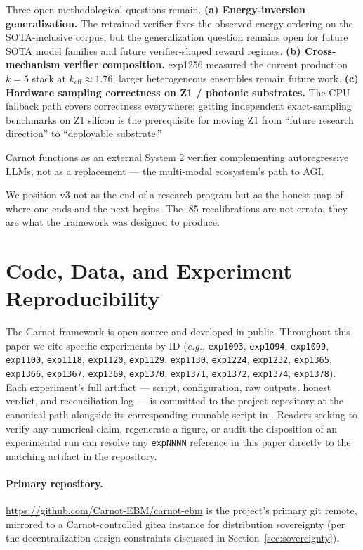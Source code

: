\documentclass[10pt]{article}
\begin{document}
Three open methodological questions remain. \textbf{(a)
Energy-inversion generalization.} The retrained verifier fixes the
observed energy ordering on the SOTA-inclusive corpus, but the
generalization question remains open for future SOTA model families
and future verifier-shaped reward regimes. \textbf{(b) Cross-mechanism
verifier composition.} exp1256 measured the current production
$k=5$ stack at $k_{\text{eff}} \approx 1.76$; larger heterogeneous
ensembles remain future work. \textbf{(c) Hardware sampling correctness on Z1 / photonic
substrates.} The CPU fallback path covers correctness everywhere;
getting independent exact-sampling benchmarks on Z1 silicon is the
prerequisite for moving Z1 from ``future research direction'' to
``deployable substrate.''

Carnot functions as an external System 2 verifier complementing
autoregressive LLMs, not as a replacement --- the multi-modal
ecosystem's path to AGI.

We position v3 not as the end of a research program but as the
honest map of where one ends and the next begins. The .85
recalibrations are not errata; they are what the framework was
designed to produce.

\section*{Code, Data, and Experiment Reproducibility}
\label{sec:availability}

The Carnot framework is open source and developed in public.
Throughout this paper we cite specific experiments by ID
(\textit{e.g.}, \texttt{exp1093}, \texttt{exp1094}, \texttt{exp1099},
\texttt{exp1100}, \texttt{exp1118}, \texttt{exp1120}, \texttt{exp1129},
\texttt{exp1130}, \texttt{exp1224}, \texttt{exp1232}, \texttt{exp1365},
\texttt{exp1366}, \texttt{exp1367}, \texttt{exp1369}, \texttt{exp1370},
\texttt{exp1371}, \texttt{exp1372}, \texttt{exp1374}, \texttt{exp1378}).
Each
experiment's full artifact --- script, configuration, raw outputs,
honest verdict, and reconciliation log --- is committed to the
project repository at the canonical path
 alongside its corresponding
runnable script in . Readers
seeking to verify any numerical claim, regenerate a figure, or audit
the disposition of an experimental run can resolve any \texttt{expNNNN}
reference in this paper directly to the matching artifact in the
repository.

\paragraph{Primary repository.}
\url{https://github.com/Carnot-EBM/carnot-ebm} is the project's primary
git remote, mirrored to a Carnot-controlled gitea instance for
distribution sovereignty (per the decentralization design constraints
discussed in Section~\ref{sec:sovereignty}).
\end{document}
